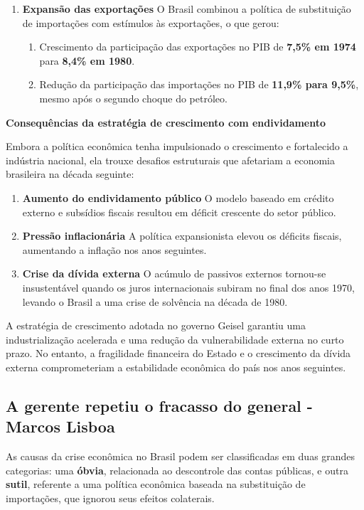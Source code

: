 \documentclass[a4paper,12pt]{article}[abntex2]
\begin{document}
\begin{enumerate}
    \item \textbf{Expansão das exportações}  
    O Brasil combinou a política de substituição de importações com estímulos às exportações, o que gerou:
    \begin{enumerate}
        \item Crescimento da participação das exportações no PIB de \textbf{7,5\% em 1974} para \textbf{8,4\% em 1980}.
        \item Redução da participação das importações no PIB de \textbf{11,9\% para 9,5\%}, mesmo após o segundo choque do petróleo.
    \end{enumerate}
\end{enumerate}

\textbf{Consequências da estratégia de crescimento com endividamento}

Embora a política econômica tenha impulsionado o crescimento e fortalecido a indústria nacional, ela trouxe desafios estruturais que afetariam a economia brasileira na década seguinte:

\begin{enumerate}
    \item \textbf{Aumento do endividamento público}  
    O modelo baseado em crédito externo e subsídios fiscais resultou em déficit crescente do setor público.

    \item \textbf{Pressão inflacionária}  
    A política expansionista elevou os déficits fiscais, aumentando a inflação nos anos seguintes.

    \item \textbf{Crise da dívida externa}  
    O acúmulo de passivos externos tornou-se insustentável quando os juros internacionais subiram no final dos anos 1970, levando o Brasil a uma crise de solvência na década de 1980.
\end{enumerate}

A estratégia de crescimento adotada no governo Geisel garantiu uma industrialização acelerada e uma redução da vulnerabilidade externa no curto prazo. No entanto, a fragilidade financeira do Estado e o crescimento da dívida externa comprometeriam a estabilidade econômica do país nos anos seguintes.

\subsection{\textbf{A gerente repetiu o fracasso do general - Marcos Lisboa}}

As causas da crise econômica no Brasil podem ser classificadas em duas grandes categorias: uma \textbf{óbvia}, relacionada ao descontrole das contas públicas, e outra \textbf{sutil}, referente a uma política econômica baseada na substituição de importações, que ignorou seus efeitos colaterais.
\end{document}
